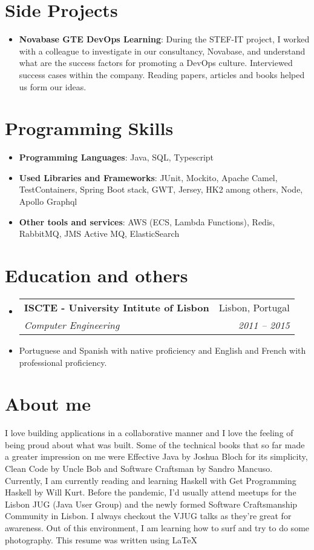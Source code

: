 \documentclass[letterpaper,11pt]{article}
\makeatletter
\newcommand{\resumeItem}[2]{
  \item\small{
    \textbf{#1}{: #2 \vspace{-4pt}}
  }
}
\newcommand{\resumeItemSimple}[1]{
  \item\small{
    {#1 \vspace{-2pt}}
  }
}
\newcommand{\resumeSubheading}[4]{
  \vspace{-2pt}\item
    \begin{tabular*}{0.97\textwidth}[t]{l@{\extracolsep{\fill}}r}
      \textbf{#1} & #2 \\
      \textit{\small#3} & \textit{\small #4} \\
    \end{tabular*}\vspace{-2pt}
}
\newcommand{\resumeSubItem}[2]{\resumeItem{#1}{#2}\vspace{-5pt}}
\newcommand{\resumeSubHeadingListStart}{\begin{itemize}[leftmargin=*]}
\newcommand{\resumeSubHeadingListEnd}{\end{itemize}}
\makeatother
\begin{document}
\section{Side Projects}
  \resumeSubHeadingListStart
    \resumeSubItem{Novabase GTE DevOps Learning}
      {During the STEF-IT project, I worked with a colleague to investigate in our consultancy, Novabase, and understand what are the success factors for promoting a DevOps culture. Interviewed success cases within the company. Reading papers, articles and books helped us form our ideas.}
  \resumeSubHeadingListEnd

\section{Programming Skills}
  \resumeSubHeadingListStart
    \resumeItemSimple
      {\textbf{Programming Languages}: Java, SQL, Typescript}
    \resumeItemSimple
      {\textbf{Used Libraries and Frameworks}: JUnit, Mockito, Apache Camel, TestContainers, Spring Boot stack, GWT, Jersey, HK2 among others, Node, Apollo Graphql}
    \resumeItemSimple
      {\textbf{Other tools and services}: AWS (ECS, Lambda Functions), Redis, RabbitMQ, JMS Active MQ, ElasticSearch}
  \resumeSubHeadingListEnd

\section{Education and others}
  \resumeSubHeadingListStart
    \resumeSubheading
      {ISCTE - University Intitute of Lisbon}{Lisbon, Portugal}
      {Computer Engineering}{2011 -- 2015}
    \resumeItemSimple
      {Portuguese and Spanish with native proficiency and English and French with professional proficiency.}
  \resumeSubHeadingListEnd
  
\section{About me}
  \small{I love building applications in a collaborative manner and I love the feeling of being proud about what was built.\newline
  Some of the technical books that so far made a greater impression on me were Effective Java by Joshua Bloch for its simplicity, Clean Code by Uncle Bob and Software Craftsman by Sandro Mancuso. Currently, I am currently reading and learning Haskell with Get Programming Haskell by Will Kurt.
  Before the pandemic, I'd usually attend meetups for the Lisbon JUG (Java User Group) and the newly formed Software Craftsmanship Community in Lisbon. I always checkout the VJUG talks as they're great for awareness.
  Out of this environment, I am learning how to surf and try to do some photography.
  \newline
  This resume was written using \LaTeX
  }
\end{document}
